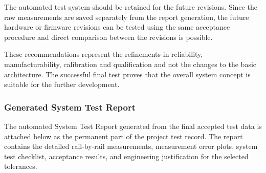 The automated test system should be retained for the future revisions. Since the raw measurements are saved separately from the report generation, the future hardware or firmware revisions can be tested using the same acceptance procedure and direct comparison between the revisions is possible.

These recommendations represent the refinements in reliability, manufacturability, calibration and qualification and not the changes to the basic architecture. The successful final test proves that the overall system concept is suitable for the further development.

\subsubsection{Generated System Test Report}
\label{sec:generated-test-report}

The automated System Test Report generated from the final accepted test data is attached below as the permanent part of the project test record. The report contains the detailed rail-by-rail measurements, measurement error plots, system test checklist, acceptance results, and engineering justification for the selected tolerances.

\clearpage

